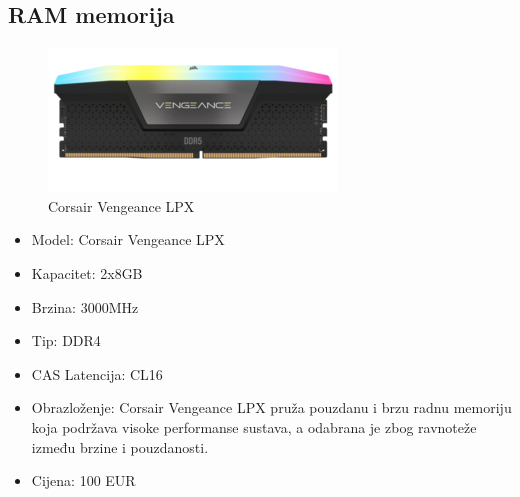 \documentclass{article}
\begin{document}
\subsection{RAM memorija}
\begin{figure}[H]
    \centering
    \includegraphics[scale=0.1]{Slike/ram.jpg}
    \caption{Corsair Vengeance LPX}
    \label{fig:RAM}
\end{figure}
\begin{itemize}
    \item Model: Corsair Vengeance LPX
    \item Kapacitet: 2x8GB
    \item Brzina: 3000MHz
    \item Tip: DDR4
    \item CAS Latencija: CL16
    \item Obrazloženje: Corsair Vengeance LPX pruža pouzdanu i brzu radnu memoriju koja podržava visoke performanse sustava, a odabrana je zbog ravnoteže između brzine i pouzdanosti.
    \item Cijena: 100 EUR
\end{itemize}
\end{document}
